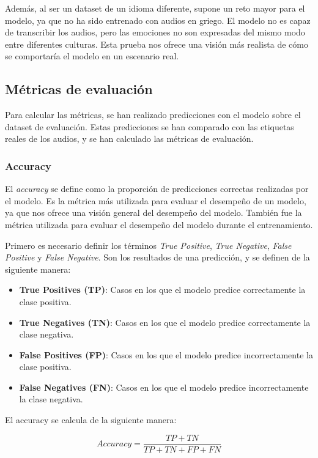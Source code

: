 Además, al ser un dataset de un idioma diferente, supone un reto mayor para el modelo, ya que no ha sido entrenado con audios en griego.
El modelo no es capaz de transcribir los audios, pero las emociones no son expresadas del mismo modo entre diferentes culturas.
Esta prueba nos ofrece una visión más realista de cómo se comportaría el modelo en un escenario real.

\subsection{Métricas de evaluación}\label{seccion:metricas-de-evaluacion}
Para calcular las métricas, se han realizado predicciones con el modelo sobre el dataset de evaluación.
Estas predicciones se han comparado con las etiquetas reales de los audios, y se han calculado las métricas de evaluación.

\subsubsection{Accuracy}\label{seccion:accuracy}
El \textit{accuracy} se define como la proporción de predicciones correctas realizadas por el modelo.
Es la métrica más utilizada para evaluar el desempeño de un modelo, ya que nos ofrece una visión general del desempeño del modelo.
También fue la métrica utilizada para evaluar el desempeño del modelo durante el entrenamiento.

Primero es necesario definir los términos \textit{True Positive}, \textit{True Negative}, \textit{False Positive} y \textit{False Negative}.
Son los resultados de una predicción, y se definen de la siguiente manera:
\begin{itemize}
    \item \textbf{True Positives (TP)}: Casos en los que el modelo predice correctamente la clase positiva.
    \item \textbf{True Negatives (TN)}: Casos en los que el modelo predice correctamente la clase negativa.
    \item \textbf{False Positives (FP)}: Casos en los que el modelo predice incorrectamente la clase positiva.
    \item \textbf{False Negatives (FN)}: Casos en los que el modelo predice incorrectamente la clase negativa.
\end{itemize}

El accuracy se calcula de la siguiente manera:

\begin{equation}
    Accuracy = \frac{TP + TN}{TP + TN + FP + FN}
\end{equation}

